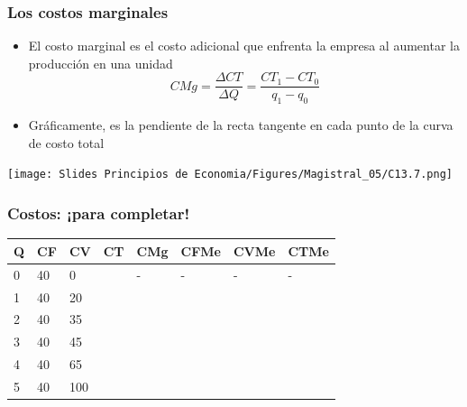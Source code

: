 \documentclass{beamer}
\begin{document}
 
\begin{frame}
\frametitle{Los costos marginales}
    \begin{minipage}{0.5\textwidth}
    \begin{itemize}
    \item El costo marginal es el costo adicional que enfrenta la empresa al aumentar la producción en una unidad 
        \[ CMg = \frac{\Delta CT}{\Delta Q} = \frac{CT_1 - CT_0}{q_1 - q_0} \]
    \item Gráficamente, es la pendiente de la recta tangente en cada punto de la curva de costo total
    \end{itemize}
    \end{minipage}
    \hfill
    \begin{minipage}{0.4\textwidth}
    \texttt{[image: Slides Principios de Economia/Figures/Magistral\_05/C13.7.png]}
    \end{minipage}
\end{frame}


\begin{frame}
\frametitle{Costos: ¡para completar! }
\begin{table}[h]
    \centering
    \renewcommand{\arraystretch}{1.5} %
    \setlength{\tabcolsep}{6pt} %
    \begin{tabular}{|P|P|P|P|P|P|P|P|}
        \hline
        \textbf{Q} & \textbf{CF} & \textbf{CV} & \textbf{CT} & \textbf{CMg} & \textbf{CFMe} & \textbf{CVMe} & \textbf{CTMe} \\
         & 40 & 0   &    & -   & -  & -  &  - \\
        1 & 40 & 20  &    &    &    &    &    \\
        2 & 40 & 35  &    &    &    &    &    \\
        3 & 40 & 45  &    &    &    &    &    \\
        4 & 40 & 65  &    &    &    &    &    \\
        5 & 40 & 100 &    &    &    &    &    \\
        \hline
    \end{tabular}
\end{table}
\end{frame}
\end{document}
